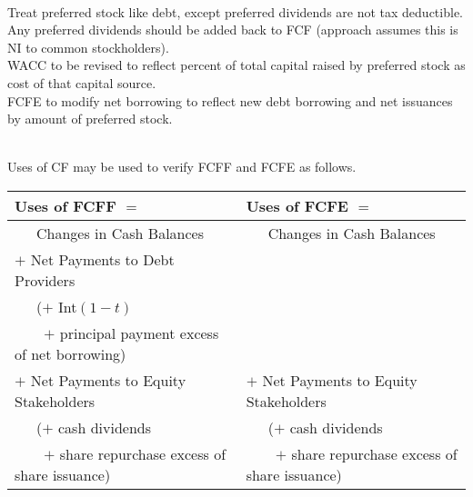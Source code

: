 \begin{method} \\
Treat preferred stock like debt, except preferred dividends are not tax deductible.\\
Any preferred dividends should be added back to FCF (approach assumes this is NI to common stockholders).\\
WACC to be revised to reflect percent of total capital raised by preferred stock as cost of that capital source.\\
FCFE to modify net borrowing to reflect new debt borrowing and net issuances by amount of preferred stock.
\end{method}

\begin{method} \\
Uses of CF may be used to verify FCFF and FCFE as follows.
\begin{flushleft}
\begin{tabularx}{\textwidth}{p{22em}|X}
\hline
\rowcolor{gray!30}
Uses of FCFF $=$ & Uses of FCFE $=$ \\
\hline
\ \ \ Changes in Cash Balances & \ \ \ Changes in Cash Balances \\
$+$ Net Payments to Debt Providers & \\
\ \ \ ($+$ Int$(1-t)$ & \\
\ \ \ \ $+$ principal payment excess of net borrowing) &  \\
$+$ Net Payments to Equity Stakeholders & $+$ Net Payments to Equity Stakeholders \\
\ \ \ ($+$ cash dividends & \ \ \ ($+$ cash dividends \\
\ \ \ \ $+$ share repurchase excess of share issuance) & \ \ \ \ $+$ share repurchase excess of share issuance) \\
\hline
\end{tabularx}
\end{flushleft}
\end{method}


